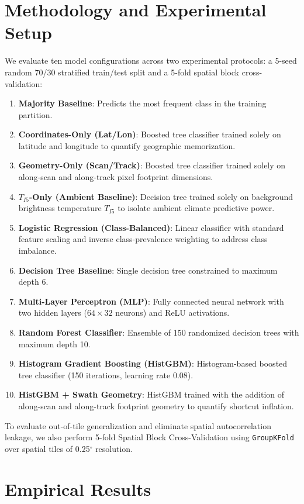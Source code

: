 \documentclass[conference]{IEEEtran}
\begin{document}
\section{Methodology and Experimental Setup}
We evaluate ten model configurations across two experimental protocols: a 5-seed random 70/30 stratified train/test split and a 5-fold spatial block cross-validation:
\begin{enumerate}
    \item \textbf{Majority Baseline}: Predicts the most frequent class in the training partition.
    \item \textbf{Coordinates-Only (Lat/Lon)}: Boosted tree classifier trained solely on latitude and longitude to quantify geographic memorization.
    \item \textbf{Geometry-Only (Scan/Track)}: Boosted tree classifier trained solely on along-scan and along-track pixel footprint dimensions.
    \item \textbf{$T_{I5}$-Only (Ambient Baseline)}: Decision tree trained solely on background brightness temperature $T_{I5}$ to isolate ambient climate predictive power.
    \item \textbf{Logistic Regression (Class-Balanced)}: Linear classifier with standard feature scaling and inverse class-prevalence weighting to address class imbalance.
    \item \textbf{Decision Tree Baseline}: Single decision tree constrained to maximum depth 6.
    \item \textbf{Multi-Layer Perceptron (MLP)}: Fully connected neural network with two hidden layers ($64 \times 32$ neurons) and ReLU activations.
    \item \textbf{Random Forest Classifier}: Ensemble of 150 randomized decision trees with maximum depth 10.
    \item \textbf{Histogram Gradient Boosting (HistGBM)}: Histogram-based boosted tree classifier (150 iterations, learning rate 0.08).
    \item \textbf{HistGBM + Swath Geometry}: HistGBM trained with the addition of along-scan and along-track footprint geometry to quantify shortcut inflation.
\end{enumerate}

To evaluate out-of-tile generalization and eliminate spatial autocorrelation leakage, we also perform 5-fold Spatial Block Cross-Validation using \texttt{GroupKFold} over \numSpatialTiles{} spatial tiles of 0.25$^\circ$ resolution.

\section{Empirical Results}
\end{document}
